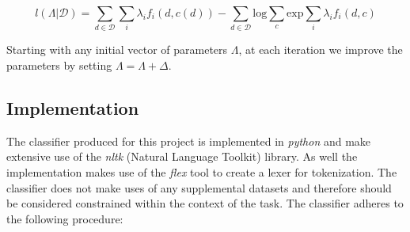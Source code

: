 \documentclass[final,3p,12pt]{elsarticle}
\begin{document}
\begin{equation}
    l(\Lambda | \mathcal{D}) = \sum\limits_{d\in\mathcal{D}} \sum\limits_{i}
    \lambda_{i} f_{i}(d,c(d)) - \sum\limits_{d\in\mathcal{D}} \mathrm{log}
    \sum\limits_{c} \mathrm{exp} \sum\limits_{i} \lambda_{i} f_{i}(d,c)
\end{equation}

Starting with any initial vector of parameters $\Lambda$, at each iteration
we improve the parameters by setting $\Lambda = \Lambda + \Delta$.


\subsection{Implementation}

The classifier produced for this project is implemented in \textit{python} and
make extensive use of the \textit{nltk} (Natural Language Toolkit) library. As
well the implementation makes use of the \textit{flex} tool to create a lexer
for tokenization. The classifier does not make uses of any supplemental
datasets and therefore should be considered constrained within the context of
the task. The classifier adheres to the following procedure:
\end{document}

